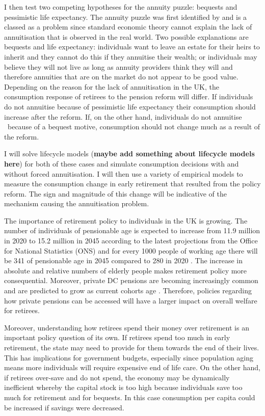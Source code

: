 \documentclass[12pt]{article}
\begin{document}
I then test two competing hypotheses for the annuity puzzle: bequests and
pessimistic life expectancy. The annuity puzzle was first identified by
\cite{yaari_65} and is a classed as a problem since standard economic theory
cannot explain the lack of annuitisation that is observed in the real world. Two
possible explanations are bequests and life expectancy: individuals want to
leave an estate for their heirs to inherit and they cannot do this if they
annuitise their wealth; or individuals may believe they will not live as long as
annuity providers think they will and therefore annuities that are on the market
do not appear to be good value. Depending on the reason for the lack of
annuitisation in the UK, the consumption response of retirees to the pension
reform will differ. If individuals do not annuitise because of pessimistic life
expectancy their consumption should increase after the reform. If, on the other
hand, individuals do not annuitise \ because of a bequest motive, consumption
should not change much as a result of the reform.

I will solve lifecycle models (\textbf{maybe add something about lifecycle
    models here}) for both of these cases and simulate consumption decisions with
and without forced annuitisation. I will then use a variety of empirical models
to measure the consumption change in early retirement that resulted from the
policy reform. The sign and magnitude of this change will be indicative of the
mechanism causing the annuitisation problem.


The importance of retirement policy to individuals in the UK is growing. The
number of individuals of pensionable age is expected to increase from 11.9
million in 2020 to 15.2 million in 2045 according to the latest projections from
the Office for National Statistics (ONS) and for every 1000 people of working
age there will be 341 of pensionable age in 2045 compared to 280 in 2020
\cite{ons_population_predictions_2020}. The increase in absolute and relative
numbers of elderly people makes retirement policy more consequential. Moreover,
private DC pensions are becoming increasingly common and are predicted to grow
as current cohorts age \cite{cribb_karjalainen_ifs_2023}. Therefore, policies
regarding how private pensions can be accessed will have a larger impact on
overall welfare for retirees.

Moreover, understanding how retirees spend their money over retirement is an
important policy question of its own. If retirees spend too much in early
retirement, the state may need to provide for them towards the end of their
lives. This has implications for government budgets, especially since population
aging means more individuals will require expensive end of life care. On the
other hand, if retirees over-save and do not spend, the economy may be
dynamically inefficient whereby the capital stock is too high because
individuals save too much for retirement and for bequests. In this case
consumption per capita could be increased if savings were decreased.
\end{document}
